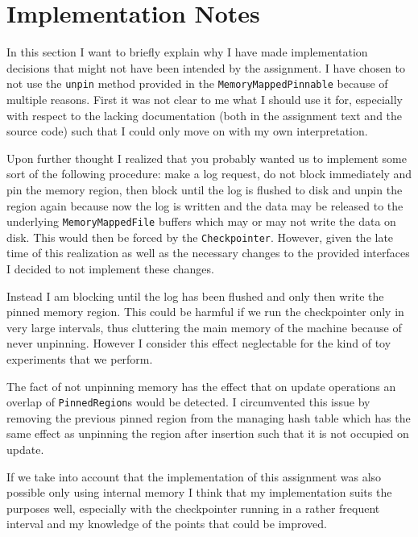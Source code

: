 \documentclass[a4paper,11pt]{article}
\begin{document}
\section{Implementation Notes}
\label{sec:notes}
In this section I want to briefly explain why I have made implementation decisions that might not have been intended by the assignment. I have chosen to not use the \texttt{unpin} method provided in the \texttt{MemoryMappedPinnable} because of multiple reasons. First it was not clear to me what I should use it for, especially with respect to the lacking documentation (both in the assignment text and the source code) such that I could only move on with my own interpretation.

Upon further thought I realized that you probably wanted us to implement some sort of the following procedure: make a log request, do not block immediately and pin the memory region, then block until the log is flushed to disk and unpin the region again because now the log is written and the data may be released to the underlying \texttt{MemoryMappedFile} buffers which may or may not write the data on disk. This would then be forced by the \texttt{Checkpointer}. However, given the late time of this realization as well as the necessary changes to the provided interfaces I decided to not implement these changes.

Instead I am blocking until the log has been flushed and only then write the pinned memory region. This could be harmful if we run the checkpointer only in very large intervals, thus cluttering the main memory of the machine because of never unpinning. However I consider this effect neglectable for the kind of toy experiments that we perform.

The fact of not unpinning memory has the effect that on update operations an overlap of \texttt{PinnedRegion}s would be detected. I circumvented this issue by removing the previous pinned region from the managing hash table which has the same effect as unpinning the region after insertion such that it is not occupied on update.

If we take into account that the implementation of this assignment was also possible only using internal memory I think that my implementation suits the purposes well, especially with  the checkpointer running in a rather frequent interval and my knowledge of the points that could be improved.
\end{document}
